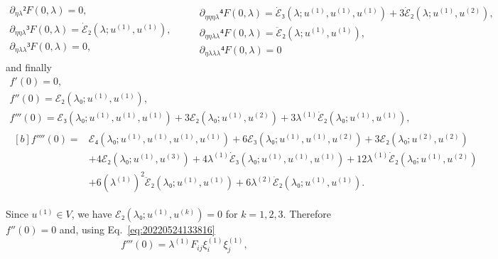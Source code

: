 \documentclass[12pt, final]{scrartcl}
\theoremstyle{definition}
\newcommand{\E}{\mathcal E}
\newcommand{\order}[2][1]{#2^{(#1)}}
\begin{document}
\begin{equation*}
  \begin{gathered}
    ∂_{η\lambda}² F(0, \lambda) = 0,\\
    ∂_{ηη\lambda}³ F(0, \lambda) = \dot{\E}₂(\lambda; \order[1]u, \order[1]u),\\
    ∂_{η\lambda\lambda}³ F(0, \lambda) = 0,\\
  \end{gathered}
  \qquad
  \begin{gathered}
    ∂_{ηηη\lambda}⁴ F(0, \lambda) = \dot{\E}₃(\lambda; \order[1]u, \order[1]u, \order[1]u) + 3\dot{\E}₂(\lambda; \order[1]u, \order[2]u),\\
    ∂_{ηη\lambda\lambda}⁴ F(0, \lambda) = \ddot{\E}₂(\lambda; \order[1]u, \order[1]u),\\
    ∂_{η\lambda\lambda\lambda}⁴ F(0, \lambda) = 0
  \end{gathered}
\end{equation*}
and finally
\begin{gather}
  f'(0) = 0,\\
  f''(0) = \E₂(\lambda₀; \order[1]u, \order[1]u),\\
  f'''(0) =\E₃(\lambda₀; \order[1]u, \order[1]u, \order[1]u) + 3\E₂(\lambda₀; \order[1]u, \order[2]u) + 3\order[1]\lambda \dot{\E}₂(\lambda₀; \order[1]u, \order[1]u),\\
  \label{eq:20220905063614}
  \begin{aligned}[b]
    f''''(0) ={}
    & \E₄(\lambda₀; \order[1]u, \order[1]u, \order[1]u, \order[1]u) + 6\E₃(\lambda₀; \order[1]u, \order[1]u, \order[2]u) + 3\E₂(\lambda₀; \order[2]u, \order[2]u)\\
    & + 4\E₂(\lambda₀; \order[1]u, \order[3]u) + 4 \order[1]\lambda \dot{\E}₃(\lambda₀; \order[1]u, \order[1]u, \order[1]u) + 12 \order[1]\lambda \dot{\E}₂(\lambda₀; \order[1]u, \order[2]u)\\
    & + 6( \order[1]\lambda )^2 \ddot{\E}₂(\lambda₀; \order[1]u, \order[1]u) + 6\order[2]\lambda \dot{\E}₂(\lambda₀; \order[1]u, \order[1]u).
  \end{aligned}
\end{gather}

Since $\order[1]u∈V$, we have $\E₂(\lambda₀; \order[1]u, \order[k]u) = 0$ for
$k = 1, 2, 3$. Therefore $f''(0)=0$ and, using
Eq.~\eqref{eq:20220524133816}
\begin{equation}
  \label{eq:20220601055448}
  f'''(0) = \order[1]\lambda F_{ij} \order[1]{ξ_i} \order[1]{ξ_j},
\end{equation}
\end{document}
